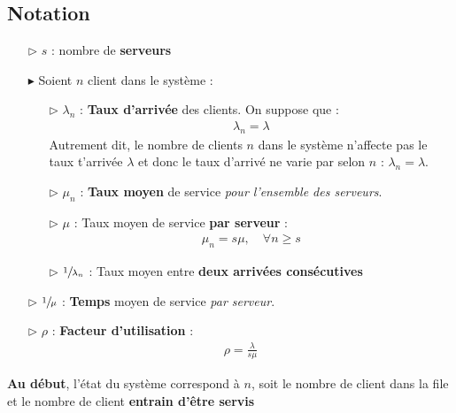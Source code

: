 \documentclass{report}
\begin{document}
\begin{multicols*}{2}
    \section{Notation}
    \begin{itemize}
        \item [$\rhd$ ] \( s \) : nombre de \textbf{serveurs}  
        \item [$\blacktriangleright$ ] Soient \( n \) client dans le système :
            \begin{itemize}
                \item [$\rhd$ ] \( \lambda_n \) : \textbf{Taux d'arrivée} des clients.
                    On suppose que : 
                \begin{align*}
                    \lambda_n = \lambda 
                \end{align*}
                Autrement dit, le nombre de clients $n$ dans le système n'affecte 
                pas le taux t'arrivée $\lambda$ et donc le 
                taux d'arrivé ne varie par selon $n$ : $\lambda_n = \lambda$. 
                \item [$\rhd$ ] \( \mu_n \) : \textbf{Taux moyen} de service 
                    \textit{pour l'ensemble des serveurs}.  
                \item [$\rhd$ ] \( \mu \) : Taux moyen de service \textbf{par serveur} : 
                    \begin{align*}
                        \mu_n  = s\mu, \quad \forall n \geq s
                    \end{align*}
                \item [$\rhd$ ] \( \sfrac{1}{\lambda_n} \) : Taux moyen entre 
                    \textbf{deux arrivées consécutives} 
            \end{itemize}
                \item [$\rhd$ ] \( \sfrac{1}{\mu} \) : \textbf{Temps}   moyen 
                    de service \textit{par serveur}.   
            \item [$\rhd$ ] \( \rho \) : \textbf{Facteur d'utilisation}   :
                \begin{align*}
                    \rho = \frac{\lambda}{s\mu}
                \end{align*}
    \end{itemize}

    \textcolor{myr}{\textbf{Au début}}, l'état du système 
    correspond à $n$, soit le nombre de client dans la 
    file et le nombre de client \textbf{entrain d'être servis}  


\end{multicols*}
\end{document}
